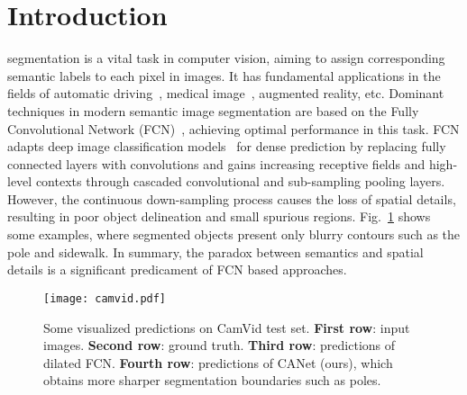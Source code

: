 \documentclass[journal]{IEEEtran}
\begin{document}
\IEEEpeerreviewmaketitle































\section{Introduction}
 segmentation is a vital task in computer vision, aiming to assign corresponding semantic labels to each pixel in images. It has fundamental applications in the fields of automatic driving~\cite{Cordts_2016_CVPR,pohlen2017full}, medical image~\cite{ronneberger2015u}, augmented reality, etc. Dominant techniques in modern semantic image segmentation are based on the Fully Convolutional Network (FCN)~\cite{long2015fully}, achieving optimal performance in this task. FCN adapts deep image classification models~\cite{he2016deep,simonyan2014very,huang2017densely,chollet2017xception} for dense prediction by replacing fully connected layers with convolutions and gains increasing receptive fields and high-level contexts through cascaded convolutional and sub-sampling pooling layers. However, the continuous down-sampling process causes the loss of spatial details, resulting in poor object delineation and small spurious regions. Fig.~\ref{fig:camvid} shows some examples, where segmented objects present only blurry contours such as the pole and sidewalk. In summary, the paradox between semantics and spatial details is a significant predicament of FCN based approaches.

\begin{figure}[t]
\begin{center}
\texttt{[image: camvid.pdf]}
\end{center}
\caption{Some visualized predictions on CamVid test set. \textbf{First row}: input images. \textbf{Second row}: ground truth. \textbf{Third row}: predictions of dilated FCN. \textbf{Fourth row}: predictions of CANet (ours), which obtains more sharper segmentation boundaries such as poles.}
\label{fig:camvid}
\end{figure}
\end{document}

